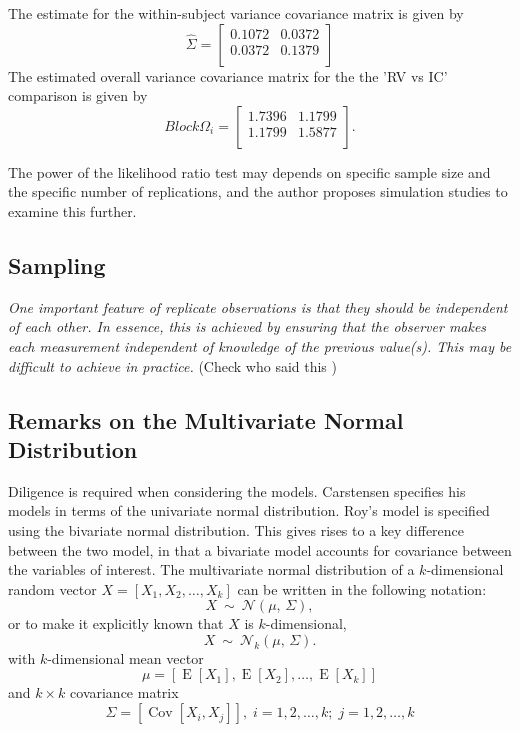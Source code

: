 \documentclass[12pt, a4paper]{report}
\theoremstyle{plain}
\theoremstyle{definition}
\theoremstyle{remark}
\begin{document}
The estimate for the within-subject variance covariance matrix is
given by
\begin{equation}
\hat{\Sigma}= \left[ \begin{array}{cc}
0.1072 & 0.0372  \\
0.0372 & 0.1379  \\
\end{array}\right]
\end{equation}
The estimated overall variance covariance matrix for the the 'RV
vs IC' comparison is given by
\begin{equation}
Block \Omega_{i}= \left[ \begin{array}{cc}
1.7396 & 1.1799  \\
1.1799 & 1.5877  \\
\end{array} \right].
\end{equation}

The power of the
likelihood ratio test may depends on specific sample size and the
specific number of  replications, and the author proposes
simulation studies to examine this further.



\newpage
\newpage


\subsection{Sampling}
	\emph{
		One important feature of replicate observations is that they should be independent
		of each other. In essence, this is achieved by ensuring that the observer makes each
		measurement independent of knowledge of the previous value(s). This may be difficult
		to achieve in practice.} (Check who said this
	)
	


\newpage

\subsection{Remarks on the Multivariate Normal Distribution}

Diligence is required when considering the models. Carstensen specifies his models in terms of the univariate normal distribution. Roy's model is specified using the bivariate normal distribution.
This gives rises to a key difference between the two model, in that a bivariate model accounts for covariance between the variables of interest.
The multivariate normal distribution of a $k$-dimensional random vector $X = [X_1, X_2, \ldots, X_k]$
can be written in the following notation:
\[
X\ \sim\ \mathcal{N}(\mu,\, \Sigma),
\]
or to make it explicitly known that $X$ is $k$-dimensional,
\[
X\ \sim\ \mathcal{N}_k(\mu,\, \Sigma).
\]
with $k$-dimensional mean vector
\[ \mu = [ \operatorname{E}[X_1], \operatorname{E}[X_2], \ldots, \operatorname{E}[X_k]] \]
and $k \times k$ covariance matrix
\[ \Sigma = [\operatorname{Cov}[X_i, X_j]], \; i=1,2,\ldots,k; \; j=1,2,\ldots,k \]
\end{document}
